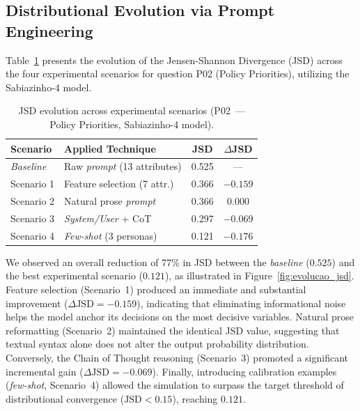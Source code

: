 \subsection{Distributional Evolution via Prompt Engineering}
\label{subsec:resultados_prompts}

Table~\ref{tab:resultados_prompts} presents the evolution of the
Jensen-Shannon Divergence (JSD) across the four experimental scenarios for
question P02 (Policy Priorities), utilizing the Sabiazinho-4 model.

\begin{table}[htbp]
    \centering
    \caption{JSD evolution across experimental scenarios (P02~--- Policy
        Priorities, Sabiazinho-4 model).}
    \label{tab:resultados_prompts}
    \begin{tabular}{@{}llcc@{}}
        \toprule
        \textbf{Scenario} & \textbf{Applied Technique} & \textbf{JSD} & \textbf{$\Delta$JSD} \\
        \midrule
        \textit{Baseline} & Raw \textit{prompt} (13 attributes) & 0.525 & --- \\
        Scenario 1 & Feature selection (7 attr.) & 0.366 & $-0.159$ \\
        Scenario 2 & Natural prose \textit{prompt} & 0.366 & $0.000$ \\
        Scenario 3 & \textit{System/User} + CoT & 0.297 & $-0.069$ \\
        Scenario 4 & \textit{Few-shot} (3 personas) & 0.121 & $\mathbf{-0.176}$ \\
        \bottomrule
    \end{tabular}
\end{table}

We observed an overall reduction of 77\% in JSD between the
\textit{baseline} ($0.525$) and the best experimental scenario ($0.121$), as
illustrated in Figure~\ref{fig:evolucao_jsd}. Feature selection (Scenario~1)
produced an immediate and substantial improvement ($\Delta\text{JSD} = -0.159$),
indicating that eliminating informational noise helps the model anchor its
decisions on the most decisive variables. Natural prose reformatting
(Scenario~2) maintained the identical JSD value, suggesting that textual syntax
alone does not alter the output probability distribution. Conversely, the Chain
of Thought reasoning (Scenario~3) promoted a significant incremental gain
($\Delta\text{JSD} = -0.069$). Finally, introducing calibration examples
(\textit{few-shot}, Scenario~4) allowed the simulation to surpass the target
threshold of distributional convergence ($\text{JSD} < 0.15$), reaching
$0.121$.

